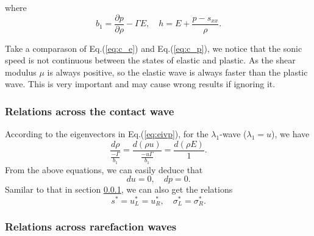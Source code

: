 \documentclass[review]{elsarticle}
\begin{document}
where 
 \begin{equation}
    b_1 = \frac{\partial p}{\partial \rho} - \Gamma E,  \quad h = E +\frac{p-s_{xx}}{\rho}.
  \end{equation}

Take a comparason  of Eq.(\ref{eq:c_e}) and Eq.(\ref{eq:c_p}), we notice that the sonic speed is not continuous between the states of elastic and plastic. As the shear modulus $\mu$ is always positive, so the elastic wave is always faster than the plastic wave.  This is very important and may cause wrong results if ignoring it.   

\subsubsection{Relations across the contact wave}\label{sec:contact}

According to  the eigenvectors in  Eq.(\ref{eq:eivp}), for the $\lambda_{1}$-wave ($\lambda_1 = u$), we
have
\begin{equation}   \label{e232a}
  \frac{d \rho}{\frac{-\Gamma}{b_1}} = \frac{d (\rho u)}{\frac{-u\Gamma}{b_1}} = \frac{d (\rho E)}{1}.
\end{equation}
From the above equations, we can easily deduce that
\begin{equation}  
  du = 0, \quad dp = 0. 
\end{equation}
Samilar to that in  section \ref{sec:contact}, we can also get the relations
\begin{equation} 
  s^* = u_L^* = u_R^*, %
 \quad
  \sigma^*_L = \sigma^*_R.
\end{equation}

\subsubsection{Relations across rarefaction waves}
\end{document}
